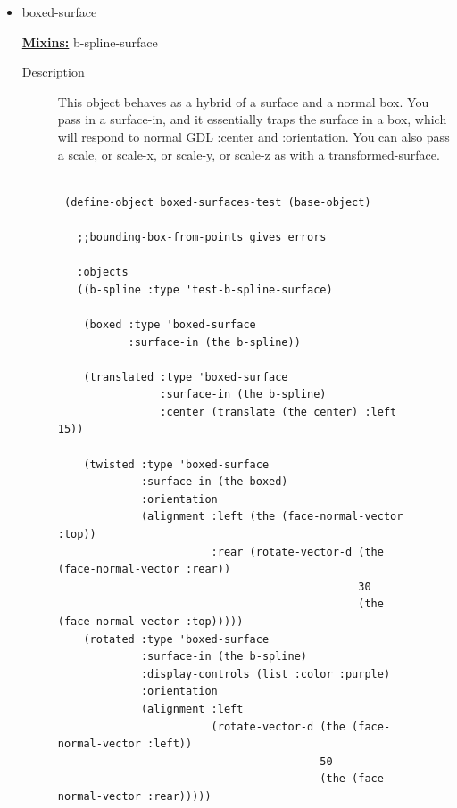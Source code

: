 \documentclass [11pt]{book}
\begin{document}
\begin{itemize}
\item {}boxed-surface


\textbf{
\underline{Mixins:}} b-spline-surface





\begin{description}

\item [
\underline{Description}]


This object behaves as a hybrid of a surface and a normal box. You 
pass in a surface-in, and it essentially traps the surface in a box, which will respond to normal
GDL :center and :orientation. You can also pass a scale, or scale-x, or scale-y, or scale-z as with
a transformed-surface.



\end{description}




\begin{figure}
\begin{lrbox}{\boxedverb}
\begin{minipage}{\linewidth}
{\small

\begin{verbatim}

 (define-object boxed-surfaces-test (base-object)

   ;;bounding-box-from-points gives errors  
  
   :objects
   ((b-spline :type 'test-b-spline-surface)
   
    (boxed :type 'boxed-surface
           :surface-in (the b-spline))
   
    (translated :type 'boxed-surface
                :surface-in (the b-spline)
                :center (translate (the center) :left 15))
   
    (twisted :type 'boxed-surface
             :surface-in (the boxed)
             :orientation 
             (alignment :left (the (face-normal-vector :top))
                        :rear (rotate-vector-d (the (face-normal-vector :rear))
                                               30
                                               (the (face-normal-vector :top)))))
    (rotated :type 'boxed-surface
             :surface-in (the b-spline)
             :display-controls (list :color :purple)
             :orientation 
             (alignment :left 
                        (rotate-vector-d (the (face-normal-vector :left))
                                         50
                                         (the (face-normal-vector :rear)))))
    

\end{verbatim}}
\end{minipage}
\end{lrbox}
\end{figure}
\end{itemize}
\end{document}
